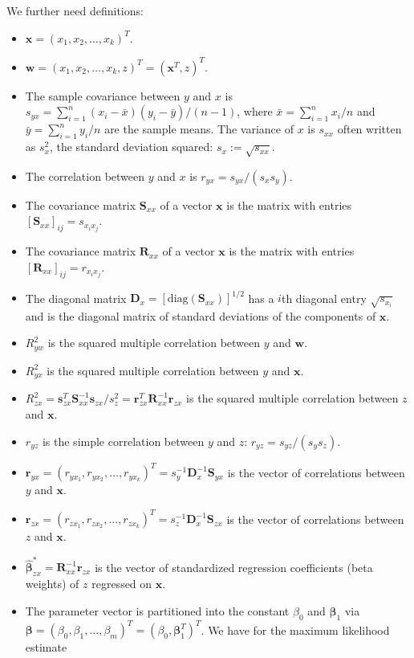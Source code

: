 \documentclass{article}
\newcommand\Br{\bm{r}}
\newcommand\Bs{\bm{s}}
\newcommand\Bw{\bm{w}}
\newcommand\Bx{\bm{x}}
\newcommand\BD{\bm{D}}
\newcommand\BR{\bm{R}}
\newcommand\BS{\bm{S}}
\newcommand\Bbe{\bm{\beta}}
\begin{document}
\begin{appendices}
We further need definitions: 
\begin{itemize}
\item $\Bx=(x_1,x_2,\ldots,x_k)^T$.
\item $\Bw=(x_1,x_2,\ldots,x_k,z)^T=(\Bx^T,z)^T$.
\item The sample covariance between $y$ and $x$
  is $s_{yx}=\sum_{i=1}^{n} (x_i-\bar{x})(y_i-\bar{y})/(n-1)$, where
  $\bar{x}=\sum_{i=1}^{n} x_i / n$ and $\bar{y}=\sum_{i=1}^{n} y_i /
  n$ are the sample means. The variance of $x$ is $s_{xx}$ often
  written as $s_x^2$, the standard deviation squared: $s_x:=\sqrt{s_{xx}}$.
\item The correlation between $y$ and $x$ is $r_{yx}=
  s_{yx}/(s_{x} s_{y})$.
\item The covariance matrix $\BS_{xx}$ of a vector $\Bx$ is the matrix
  with entries $[\BS_{xx}]_{ij}=s_{x_i x_j}$.
\item The covariance matrix $\BR_{xx}$ of a vector $\Bx$ is the matrix
  with entries $[\BR_{xx}]_{ij}=r_{x_i x_j}$.
\item The diagonal matrix $\BD_x=[\mathrm{diag}(\BS_{xx})]^{1/2}$
  has a $i$th diagonal entry
  $\sqrt{s_{x_i}}$ and is the diagonal matrix of standard deviations of the components
  of $\Bx$.
\item $R^2_{yw}$ is the squared multiple correlation between $y$ and $\Bw$.
\item $R^2_{yx}$ is the squared multiple correlation between $y$ and $\Bx$.
\item $R^2_{zx}=\Bs_{zx}^T \BS_{xx}^{-1}\Bs_{zx} / s_z^2=\Br_{zx}^T \BR_{xx}^{-1}\Br_{zx}$  is
  the squared multiple correlation between $z$ and $\Bx$.
\item $r_{yz}$ is the simple correlation between $y$ and $z$: $r_{yz}=
  s_{yz}/(s_{y} s_{z})$.
\item $\Br_{yx}=(r_{yx_1},r_{yx_2},\ldots,r_{yx_k})^T=s_y^{-1}
  \BD_x^{-1} \BS_{yx}$ is
  the vector of correlations between $y$ and $\Bx$.
\item $\Br_{zx}=(r_{zx_1},r_{zx_2},\ldots,r_{zx_k})^T=s_z^{-1}
  \BD_x^{-1} \BS_{zx}$ is
  the vector of correlations between $z$ and $\Bx$.
\item $\hat{\Bbe}^*_{zx}=\BR_{xx}^{-1} \Br_{zx}$ is
  the vector of standardized regression coefficients (beta weights)
of $z$ regressed on $\Bx$.
\item The parameter vector is partitioned into the constant $\beta_0$
  and $\Bbe_1$ via
  $\Bbe=(\beta_0,\beta_1,\ldots,\beta_m)^T=(\beta_0,\Bbe_1^T)^T$.
  We have for the maximum likelihood estimate

\end{itemize}
\end{appendices}
\end{document}
